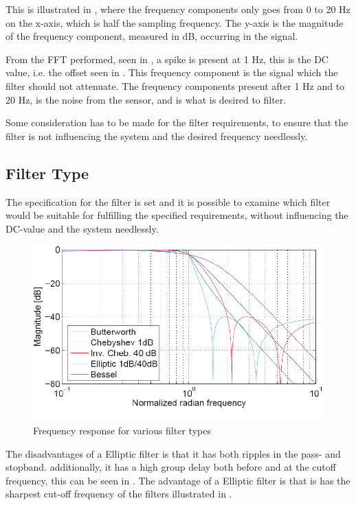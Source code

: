 This is illustrated in , where the frequency components only goes from 0 to 20 Hz on the x-axis, which is half the sampling frequency. The y-axis is the magnitude of the frequency component, measured in \si{dB}, occurring in the signal.

From the FFT performed, seen in , a spike is present at 1 \si{Hz}, this is the DC value, i.e. the offset seen in . This frequency component is the signal which the filter should not attenuate. The frequency components present after 1 Hz and to 20 Hz, is the noise from the sensor, and is what is desired to filter. 

Some consideration has to be made for the filter requirements, to ensure that the filter is not influencing the system and the desired frequency needlessly.

\subsection{Filter Type}
The specification for the filter is set and it is possible to examine which filter would be suitable for fulfilling the specified requirements, without influencing the DC-value and the system needlessly.

\begin{figure}[H]
	\centering
	\includegraphics[scale=1]{figures/Filtertypes1.pdf}
	\caption{Frequency response for various filter types}
	\label{fig:Filtertype1}
\end{figure}

The disadvantages of a Elliptic filter is that it has both ripples in the pass- and stopband. additionally, it has a high group delay both before and at the cutoff frequency, this can be seen in . The advantage of a Elliptic filter is that is has the sharpest cut-off frequency of the filters illustrated in .


